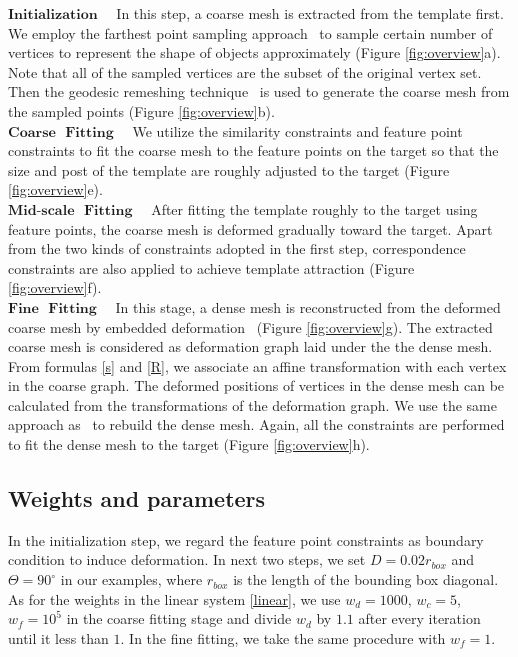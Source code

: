 $\textbf{Initialization}$ ~~In this step, a coarse mesh is extracted from the template first. We employ the farthest point sampling approach~\citep{moenning2003fast} to sample certain number of vertices to represent the shape of objects approximately (Figure \ref{fig:overview}a). Note that all of the sampled vertices are the subset of the original vertex set. Then the geodesic remeshing technique~\citep{surazhsky2005fast} is used to generate the coarse mesh from the sampled points (Figure \ref{fig:overview}b). \\

$\textbf{Coarse}$ $\textbf{ Fitting}$ ~~We utilize the similarity constraints and feature point constraints to fit the coarse mesh to the feature points on the target so that the size and post of the template are roughly adjusted to the target (Figure \ref{fig:overview}e).\\

$\textbf{Mid-scale}$ $\textbf{ Fitting}$ ~~After fitting the template roughly to the target using feature points, the coarse mesh is deformed gradually toward the target. Apart from the two kinds of constraints adopted in the first step, correspondence constraints are also applied to achieve template attraction (Figure \ref{fig:overview}f).\\

$\textbf{Fine}$ $\textbf{ Fitting}$ ~~In this stage, a dense mesh is reconstructed from the deformed coarse mesh by embedded deformation~\citep{sumner2007embedded} (Figure \ref{fig:overview}g). The extracted coarse mesh is considered as deformation graph laid under the the dense mesh. From formulas \eqref{s} and \eqref{R}, we associate an affine transformation with each vertex in the coarse graph. The deformed positions of vertices in the dense mesh can be calculated from the transformations of the deformation graph. We use the same approach as~\cite{yoshiyasu2014conformal} to rebuild the dense mesh. Again, all the constraints are performed to fit the dense mesh to the target (Figure \ref{fig:overview}h).


\subsection{Weights and parameters}
In the initialization step, we regard the feature point constraints as boundary condition to induce deformation. In next two steps, we set $D = 0.02r_{box}$ and $\Theta = 90^\circ$ in our examples, where $r_{box}$ is the length of the bounding box diagonal. As for the weights in the linear system \eqref{linear}, we use $w_{d} = 1000$, $w_{c} = 5$, $w_{f} = 10^5$ in the coarse fitting stage and divide $w_{d}$ by $1.1$ after every iteration until it less than $1$. In the fine fitting, we take the same procedure with $w_f = 1$.




